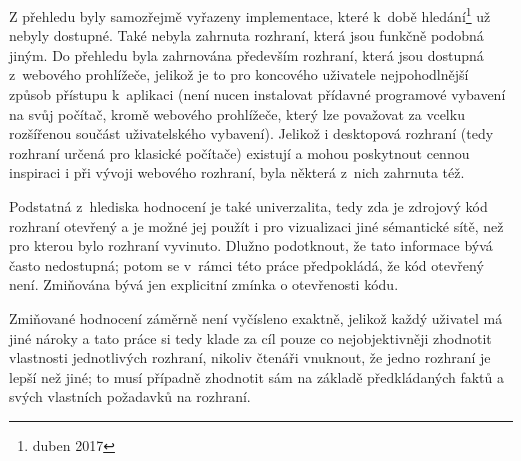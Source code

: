 \documentclass[a4paper, 11pt, oneside, showtrims]{book}
\begin{document}
				Z přehledu byly samozřejmě vyřazeny implementace, které k~době hledání\footnote{duben 2017} už nebyly dostupné. Také nebyla zahrnuta rozhraní, která jsou funkčně podobná jiným. Do přehledu byla zahrnována především rozhraní, která jsou dostupná z~webového prohlížeče, jelikož je to pro koncového uživatele nejpohodlnější způsob přístupu k~aplikaci (není nucen instalovat přídavné programové vybavení na svůj počítač, kromě webového prohlížeče, který lze považovat za vcelku rozšířenou součást uživatelského vybavení). Jelikož i desktopová rozhraní (tedy rozhraní určená pro klasické počítače) existují a mohou poskytnout cennou inspiraci i při vývoji webového rozhraní, byla některá z~nich zahrnuta též. 

				Podstatná z~hlediska hodnocení je také univerzalita, tedy zda je zdrojový kód rozhraní otevřený a je možné jej použít i pro vizualizaci jiné sémantické sítě, než pro kterou bylo rozhraní vyvinuto. Dlužno podotknout, že tato informace bývá často nedostupná; potom se v~rámci této práce předpokládá, že kód otevřený není. Zmiňována bývá jen explicitní zmínka o otevřenosti kódu.

				Zmiňované hodnocení záměrně není vyčísleno exaktně, jelikož každý uživatel má jiné nároky a tato práce si tedy klade za cíl pouze co nejobjektivněji zhodnotit vlastnosti jednotlivých rozhraní, nikoliv čtenáři vnuknout, že jedno rozhraní je lepší než jiné; to musí případně zhodnotit sám na základě předkládaných faktů a svých vlastních požadavků na rozhraní.

\end{document}
